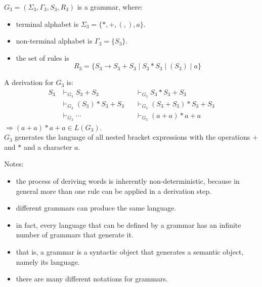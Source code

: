 \documentclass[a4paper,11pt,utf8]{article}
\newcommand{\lineindent}{\hspace*{\parindent}}
\begin{document}
\begin{tcolorbox}[title=example 4,colback=white,colframe=black,width=\textwidth,arc=0pt]
    $G_3 = (\Sigma_3,\Gamma_3,S_3,R_3)$ is a grammar, where:
    \begin{itemize}
        \item terminal alphabet is $\Sigma_3 = \{*,+,(,),a\}$.
        \item non-terminal alphabet is $\Gamma_3 = \{S_3\}$.
        \item the set of rules is \[
            R_3 = \{S_3 \to S_3 + S_3 \mid S_3 * S_3 \mid (S_3) \mid a\}
        \]
    \end{itemize}
    A derivation for $G_3$ is:
    \[
        \begin{aligned}
            S_3 &\vdash_{G_3} S_3 + S_3 &&\vdash_{G_3} S_3 * S_3 + S_3 \\[1ex]
                &\vdash_{G_3} (S_3) * S_3 + S_3 &&\vdash_{G_3} (S_3 + S_3) * S_3 + S_3 \\[1ex]
                &\vdash_{G_3} \cdots &&\vdash_{G_3} (a + a) * a + a
        \end{aligned}
    \]
    \lineindent $\Rightarrow (a + a) * a + a \in L(G_3)$. \\
    \lineindent $G_3$ generates the language of all nested bracket expressions with the operations $+$ and $*$ and a character $a$.
\end{tcolorbox}
Notes:
\begin{itemize}
    \item the process of deriving words is inherently non-deterministic, because in general more than one rule can be applied in a derivation step.
    \item different grammars can produce the same language.
    \item in fact, every language that can be defined by a grammar has an infinite number of grammars that generate it.
    \item that is, a grammar is a syntactic object that generates a semantic object, namely its language.
    \item there are many different notations for grammars.
\end{itemize}
\end{document}
